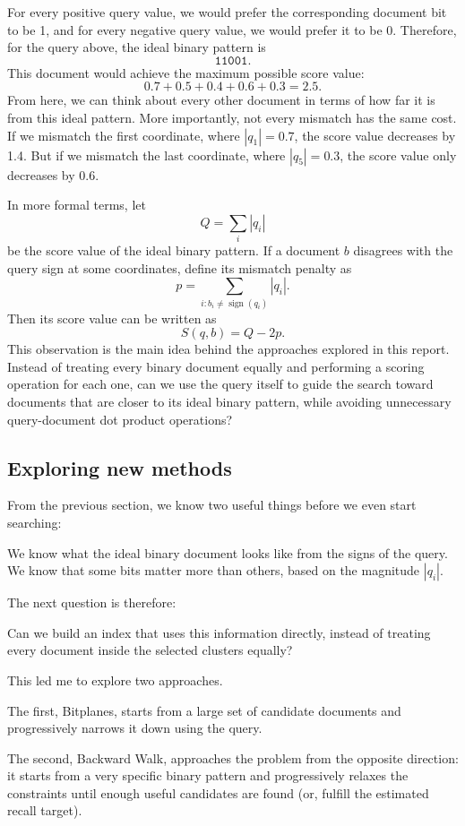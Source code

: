 For every positive query value, we would prefer the corresponding document bit to be 1,
and for every negative query value, we would prefer it to be 0. Therefore, for the query
above, the ideal binary pattern is
\[
\texttt{11001}.
\]
This document would achieve the maximum possible score value:
\[
0.7+0.5+0.4+0.6+0.3=2.5.
\]
From here, we can think about every other document in terms of how far it is from this ideal
pattern. More importantly, not every mismatch has the same cost. If we mismatch the first
coordinate, where $|q_1|=0.7$, the score value decreases by 1.4. But if we mismatch the last
coordinate, where $|q_5|=0.3$, the score value only decreases by 0.6.

In more formal terms, let
\[
Q=\sum_i|q_i|
\]
be the score value of the ideal binary pattern. If a document $b$ disagrees with the query sign
at some coordinates, define its mismatch penalty as
\[
p=\sum_{i:b_i\ne\operatorname{sign}(q_i)}|q_i|.
\]
Then its score value can be written as
\begin{equation}
S(q,b)=Q-2p.
\label{eq:score}
\end{equation}
This observation is the main idea behind the approaches explored in this report. Instead
of treating every binary document equally and performing a scoring operation for each one, can we use
the query itself to guide the search toward documents that are closer to its ideal binary
pattern, while avoiding unnecessary query-document dot product operations?

\subsection{Exploring new methods}
From the previous section, we know two useful things before we even start searching:

We know what the ideal binary document looks like from the signs of the query.
We know that some bits matter more than others, based on the magnitude $|q_i|$.

The next question is therefore:

Can we build an index that uses this information directly, instead of treating every
document inside the selected clusters equally?

This led me to explore two approaches.

The first, Bitplanes, starts from a large set of candidate documents and progressively
narrows it down using the query.

The second, Backward Walk, approaches the problem from the opposite direction: it starts
from a very specific binary pattern and progressively relaxes the constraints until enough
useful candidates are found (or, fulfill the estimated recall target).

